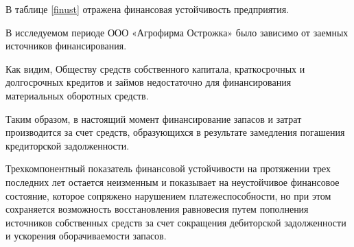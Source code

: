 В таблице \ref{finust} отражена финансовая устойчивость предприятия.



В исследуемом периоде ООО «Агрофирма Острожка»  было зависимо от заемных источников финансирования.

Как видим, Обществу средств собственного капитала, краткосрочных и долгосрочных кредитов и займов недостаточно для финансирования материальных оборотных средств.

Таким образом, в настоящий момент финансирование запасов и затрат производится за счет средств, образующихся в результате замедления погашения кредиторской задолженности.

Трехкомпонентный показатель финансовой устойчивости на протяжении трех последних лет остается неизменным и показывает на неустойчивое финансовое состояние, которое сопряжено нарушением платежеспособности, но при этом сохраняется возможность восстановления равновесия путем пополнения источников собственных средств за счет сокращения дебиторской задолженности и ускорения оборачиваемости запасов.








